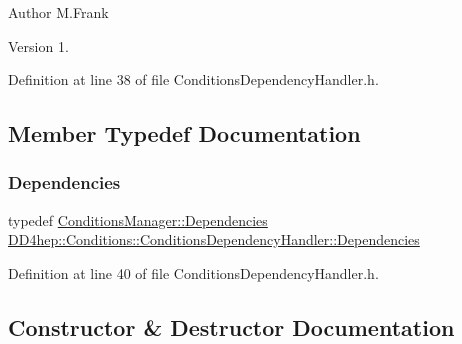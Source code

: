 \begin{DoxyAuthor}{Author}
M.\+Frank 
\end{DoxyAuthor}
\begin{DoxyVersion}{Version}
1. 
\end{DoxyVersion}


Definition at line 38 of file Conditions\+Dependency\+Handler.\+h.



\subsection{Member Typedef Documentation}
\hypertarget{class_d_d4hep_1_1_conditions_1_1_conditions_dependency_handler_a4a063b30ffccb0e30f3302f1537aef10}{}\label{class_d_d4hep_1_1_conditions_1_1_conditions_dependency_handler_a4a063b30ffccb0e30f3302f1537aef10} 
\subsubsection{\texorpdfstring{Dependencies}{Dependencies}}
{\footnotesize\ttfamily typedef \hyperlink{class_d_d4hep_1_1_conditions_1_1_conditions_manager_aab778cfbe096ae8ad20a0bdbb047ad32}{Conditions\+Manager\+::\+Dependencies} \hyperlink{class_d_d4hep_1_1_conditions_1_1_conditions_dependency_handler_a4a063b30ffccb0e30f3302f1537aef10}{D\+D4hep\+::\+Conditions\+::\+Conditions\+Dependency\+Handler\+::\+Dependencies}}



Definition at line 40 of file Conditions\+Dependency\+Handler.\+h.



\subsection{Constructor \& Destructor Documentation}
\hypertarget{class_d_d4hep_1_1_conditions_1_1_conditions_dependency_handler_a955647ff8dc9227dc10953d9accf2d62}{}\label{class_d_d4hep_1_1_conditions_1_1_conditions_dependency_handler_a955647ff8dc9227dc10953d9accf2d62} 
